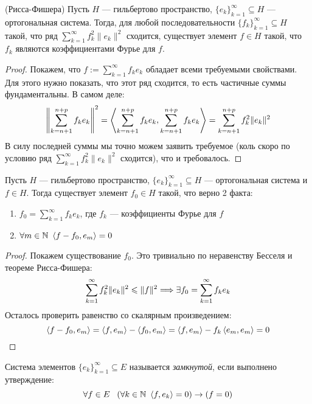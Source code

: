 \begin{theorem} (Рисса-Фишера)
	Пусть $H$ --- гильбертово пространство, $\{e_k\}_{k = 1}^\infty \subseteq H$ --- ортогональная система. Тогда, для любой последовательности $\{f_k\}_{k = 1}^\infty \subseteq H$ такой, что ряд $\sum_{k = 1}^\infty f_k^2\|e_k\|^2$ сходится, существует элемент $f \in H$ такой, что $f_k$ являются коэффициентами Фурье для $f$.
\end{theorem}

\begin{proof}
	Покажем, что $f := \sum_{k = 1}^\infty f_ke_k$ обладает всеми требуемыми свойствами. Для этого нужно показать, что этот ряд сходится, то есть частичные суммы фундаментальны. В самом деле:
	\[
		\left\|\sum_{k = n + 1}^{n + p} f_ke_k\right\|^2 = \left\langle\sum_{k = n + 1}^{n + p} f_ke_k, \sum_{k = n + 1}^{n + p} f_ke_k\right\rangle = \sum_{k = n + 1}^{n + p} f_k^2 \|e_k\|^2
	\]
	В силу последней суммы мы точно можем заявить требуемое (коль скоро по условию ряд $\sum_{k = 1}^\infty f_k^2 \|e_k\|^2$ сходится), что и требовалось.
\end{proof}

\begin{corollary}
	Пусть $H$ --- гильбертово пространство, $\{e_k\}_{k = 1}^\infty \subseteq H$ --- ортогональная система и $f \in H$. Тогда существует элемент $f_0 \in H$ такой, что верно 2 факта:
	\begin{enumerate}
		\item $f_0 = \sum_{k = 1}^\infty f_ke_k$, где $f_k$ --- коэффициенты Фурье для $f$
		
		\item $\forall m \in \mathbb{N}\ \left\langle f - f_0, e_m\right\rangle = 0$
	\end{enumerate}
\end{corollary}

\begin{proof}
	Покажем существование $f_0$. Это тривиально по неравенству Бесселя и теореме Рисса-Фишера:
	\[
		\sum_{k = 1}^\infty f_k^2 \|e_k\|^2 \leqslant \|f\|^2 \Longrightarrow \exists f_0 = \sum_{k = 1}^\infty f_ke_k
	\]
	Осталось проверить равенство со скалярным произведением:
	\[
		\left\langle f - f_0, e_m\right\rangle = \left\langle f, e_m\right\rangle - \left\langle f_0, e_m\right\rangle = \left\langle f, e_m\right\rangle - f_k\left\langle e_m, e_m\right\rangle = 0
	\]
\end{proof}

\begin{definition}
	Система элементов $\{e_k\}_{k = 1}^\infty \subseteq E$ называется \textit{замкнутой}, если выполнено утверждение:
	\[
		\forall f \in E\ \ \left(\forall k \in \mathbb{N}\ \left\langle f, e_k\right\rangle = 0\right) \rightarrow (f = 0) 
	\]
\end{definition}

